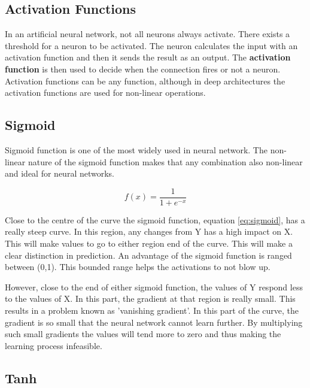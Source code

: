 \subsection{Activation Functions}

In an artificial neural network, not all neurons always activate. There exists a threshold for a neuron to be activated. The neuron calculates the input with an activation function and then it sends the result as an output. The \textbf{activation function} is then used to decide when the connection fires or not a neuron. Activation functions can be any function, although in deep architectures the activation functions are used for non-linear operations. 

\subsection{Sigmoid}

Sigmoid function is one of the most widely used in neural network. The non-linear nature of the sigmoid function makes that any combination also non-linear and ideal for neural networks. 

\begin{equation} \label{eq:sigmoid}
	f(x)=\frac{\mathrm{1} }{\mathrm{1} + e^{-x}}
\end{equation}

Close to the centre of the curve the sigmoid function, equation \ref{eq:sigmoid}, has a really steep curve. In this region, any changes from Y has a high impact on X. This will make values to go to either region end of the curve. This will make a clear distinction in prediction. An advantage of the sigmoid function is ranged between (0,1). This bounded range helps the activations to not blow up. \cite{SharmaVUnderstandingNetworks}



However, close to the end of either sigmoid function, the values of Y respond less to the values of X. In this part, the gradient at that region is really small. This results in a problem known as 'vanishing gradient'. In this part of the curve, the gradient is so small that the neural network cannot learn further. By multiplying such small gradients the values will tend more to zero and thus making the learning process infeasible.

\subsection{Tanh}

